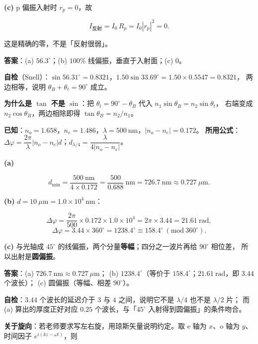 \documentclass[11pt]{ctexart}
\begin{document}
\textbf{(c)} p 偏振入射时 $r_p=0$，故

\[
I_{\text{反射}}=I_0\,R_p=I_0|r_p|^2=0 .
\]

这是精确的零，不是「反射很弱」。

\textbf{答案}：(a) $56.3^\circ$；(b) $100\%$ 线偏振，垂直于入射面；(c) $0$。

\textbf{自检}（Snell）：$\sin56.31^\circ=0.8321$，$1.50\sin33.69^\circ=1.50\times0.5547=0.8321$，
两边相等，说明 $\theta_B+\theta_t=90^\circ$ 成立。

\textbf{为什么是 $\tan$ 不是 $\sin$}：把 $\theta_t=90^\circ-\theta_B$ 代入 $n_1\sin\theta_B=n_2\sin\theta_t$，
右端变成 $n_2\cos\theta_B$，两边相除即得 $\tan\theta_B=n_2/n_1$。


\textbf{已知}：$n_o=1.658$，$n_e=1.486$，$\lambda=500\ \mathrm{nm}$，$|n_o-n_e|=0.172$。
\textbf{所用公式}：$\Delta\varphi=\dfrac{2\pi}{\lambda}|n_o-n_e|d$；$d_{\lambda/4}=\dfrac{\lambda}{4|n_o-n_e|}$。

\textbf{(a)}

\[
d_{\min}=\frac{500\ \mathrm{nm}}{4\times0.172}=\frac{500}{0.688}\ \mathrm{nm}
=726.7\ \mathrm{nm}\approx0.727\ \mu\mathrm{m}.
\]

\textbf{(b)} $d=10\ \mu\mathrm{m}=1.0\times10^4\ \mathrm{nm}$：

\[
\Delta\varphi=\frac{2\pi}{500}\times0.172\times1.0\times10^4=2\pi\times3.44=21.61\ \mathrm{rad},
\]
\[
\Delta\varphi=3.44\times360^\circ=1238.4^\circ\equiv158.4^\circ\ (\mathrm{mod}\ 360^\circ).
\]

\textbf{(c)} 与光轴成 $45^\circ$ 的线偏振，两个分量\textbf{等幅}；四分之一波片再给 $90^\circ$ 相位差，
所以出射是\textbf{圆偏振}。

\textbf{答案}：(a) $726.7\ \mathrm{nm}\approx0.727\ \mu\mathrm{m}$；
(b) $1238.4^\circ$（等价于 $158.4^\circ$；$21.61\ \mathrm{rad}$，即 $3.44$ 个波长）；
(c) 圆偏振（等幅、相差 $90^\circ$）。

\textbf{自检}：$3.44$ 个波长的延迟介于 $3$ 与 $4$ 之间，说明它不是 $\lambda/4$ 也不是 $\lambda/2$ 片；
而 (a) 算出的厚度正好对应 $0.25$ 个波长，与「$45^\circ$ 入射得到圆偏振」的条件吻合。

\textbf{关于旋向}：若老师要求写左右旋，用琼斯矢量说明约定。取 e 轴为 $x$、o 轴为 $y$、
时间因子 $e^{i(kz-\omega t)}$，则
\end{document}
